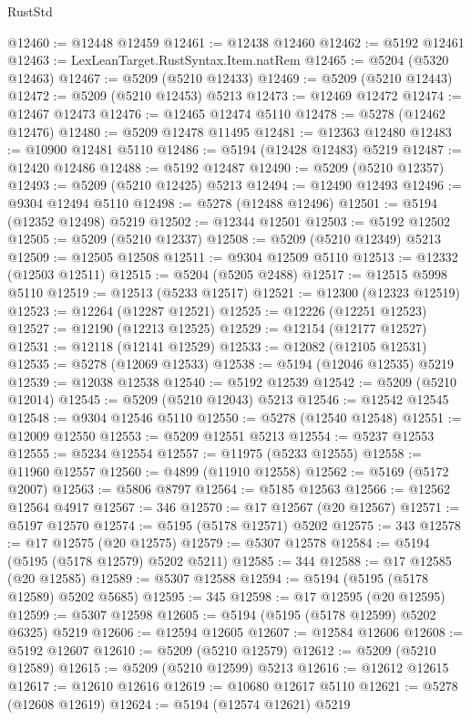 \begin{lexlean}{RustStd}
\begin{coremodule}
@12460 := @12448 @12459
@12461 := @12438 @12460
@12462 := @5192 @12461
@12463 := LexLeanTarget.RustSyntax.Item.natRem
@12465 := @5204 (@5320 @12463)
@12467 := @5209 (@5210 @12433)
@12469 := @5209 (@5210 @12443)
@12472 := @5209 (@5210 @12453) @5213
@12473 := @12469 @12472
@12474 := @12467 @12473
@12476 := @12465 @12474 @5110
@12478 := @5278 (@12462 @12476)
@12480 := @5209 @12478 @11495
@12481 := @12363 @12480
@12483 := @10900 @12481 @5110
@12486 := @5194 (@12428 @12483) @5219
@12487 := @12420 @12486
@12488 := @5192 @12487
@12490 := @5209 (@5210 @12357)
@12493 := @5209 (@5210 @12425) @5213
@12494 := @12490 @12493
@12496 := @9304 @12494 @5110
@12498 := @5278 (@12488 @12496)
@12501 := @5194 (@12352 @12498) @5219
@12502 := @12344 @12501
@12503 := @5192 @12502
@12505 := @5209 (@5210 @12337)
@12508 := @5209 (@5210 @12349) @5213
@12509 := @12505 @12508
@12511 := @9304 @12509 @5110
@12513 := @12332 (@12503 @12511)
@12515 := @5204 (@5205 @2488)
@12517 := @12515 @5998 @5110
@12519 := @12513 (@5233 @12517)
@12521 := @12300 (@12323 @12519)
@12523 := @12264 (@12287 @12521)
@12525 := @12226 (@12251 @12523)
@12527 := @12190 (@12213 @12525)
@12529 := @12154 (@12177 @12527)
@12531 := @12118 (@12141 @12529)
@12533 := @12082 (@12105 @12531)
@12535 := @5278 (@12069 @12533)
@12538 := @5194 (@12046 @12535) @5219
@12539 := @12038 @12538
@12540 := @5192 @12539
@12542 := @5209 (@5210 @12014)
@12545 := @5209 (@5210 @12043) @5213
@12546 := @12542 @12545
@12548 := @9304 @12546 @5110
@12550 := @5278 (@12540 @12548)
@12551 := @12009 @12550
@12553 := @5209 @12551 @5213
@12554 := @5237 @12553
@12555 := @5234 @12554
@12557 := @11975 (@5233 @12555)
@12558 := @11960 @12557
@12560 := @4899 (@11910 @12558)
@12562 := @5169 (@5172 @2007)
@12563 := @5806 @8797
@12564 := @5185 @12563
@12566 := @12562 @12564 @4917
@12567 := 346
@12570 := @17 @12567 (@20 @12567)
@12571 := @5197 @12570
@12574 := @5195 (@5178 @12571) @5202
@12575 := 343
@12578 := @17 @12575 (@20 @12575)
@12579 := @5307 @12578
@12584 := @5194 (@5195 (@5178 @12579) @5202 @5211)
@12585 := 344
@12588 := @17 @12585 (@20 @12585)
@12589 := @5307 @12588
@12594 := @5194 (@5195 (@5178 @12589) @5202 @5685)
@12595 := 345
@12598 := @17 @12595 (@20 @12595)
@12599 := @5307 @12598
@12605 := @5194 (@5195 (@5178 @12599) @5202 @6325) @5219
@12606 := @12594 @12605
@12607 := @12584 @12606
@12608 := @5192 @12607
@12610 := @5209 (@5210 @12579)
@12612 := @5209 (@5210 @12589)
@12615 := @5209 (@5210 @12599) @5213
@12616 := @12612 @12615
@12617 := @12610 @12616
@12619 := @10680 @12617 @5110
@12621 := @5278 (@12608 @12619)
@12624 := @5194 (@12574 @12621) @5219

\end{coremodule}
\end{lexlean}
